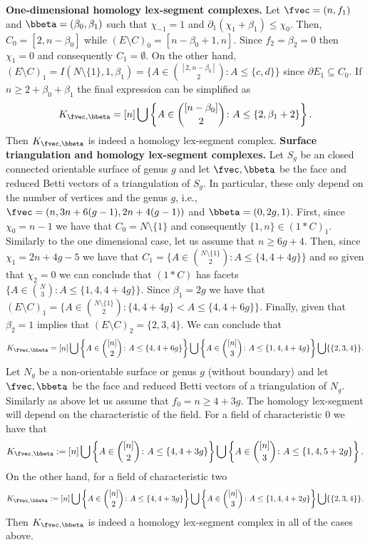%
\noindent
{\bf One-dimensional homology lex-segment complexes.}
Let $\fvec=(n,f_1)$ and $\bbeta=(\beta_0,\beta_1)$ such that $\chi_{-1} = 1$ and $\partial_1(\chi_1+\beta_1)\leq \chi_0$.
Then, $C_0=[2,n-\beta_0]$ while $(E\setminus C)_0=[n-\beta_0+1,n]$.
Since $f_2=\beta_2=0$ then $\chi_1=0$ and consequently $C_1=\emptyset$. 
On the other hand, $(E\setminus C)_1 = I(N\setminus \{1\},1,\beta_1) = \{A \in \binom{[2,n-\beta_0]}{2} \colon A \leq \{c,d\}\}$ since $\partial E_1 \subseteq C_0$.
If $n \geq 2 + \beta_0 + \beta_1$ the final expression can be simplified as
\begin{equation}
  \label{eq:hseggraph}
  K_{\fvec,\bbeta} =  [n] \bigcup \left \{ A \in \binom{[n-\beta_0]}{2} \colon A \leq \{2,\beta_1+2\} \right \}.
\end{equation}
Then $K_{\fvec,\bbeta}$ is indeed a homology lex-segment complex.
%
\noindent
{\bf Surface triangulation and homology lex-segment complexes.}
Let $S_g$ be an closed connected orientable surface of genus $g$ and let $\fvec,\bbeta$ be the face and reduced Betti vectors of a triangulation of $S_g$. 
In particular, these only depend on the number of vertices and the genus $g$, i.e., $\fvec=(n,3n+6(g-1),2n+4(g-1))$ and $\bbeta=(0,2g,1)$.
First, since $\chi_0=n-1$ we have that $C_0=N\setminus \{1\}$ and consequently $\{1,n\}\in (1*C)_1$.
Similarly to the 
one dimensional case,
let us assume that $n\geq 6g+4$.
Then, since $\chi_1 = 2n+4g-5$ we have that $C_1 = \{A \in \binom{N\setminus \{1\}}{2} \colon A \leq \{4,4+4g\}\}$ and so given that $\chi_2=0$ we can conclude that $(1*C)$ has facets $\{A \in \binom{N}{3} \colon A \leq \{1,4,4+4g\}\}$.
%
Since $\beta_1=2g$ we have that $(E\setminus C)_1=\{A \in \binom{N\setminus \{1\}}{2}\colon \{4,4+4g\} < A \leq \{4,4+6g\}\}$. Finally, given that $\beta_2=1$ implies that $(E\setminus C)_2=\{2,3,4\}$. We can conclude that
\begin{equation}
\label{eq:hsegsrf}
K_{\fvec,\bbeta} = [n] \bigcup \left \{A \in \binom{[n]}{2}\colon A \leq \{4,4+6g\} \right \} \bigcup \left \{ A \in \binom{[n]}{3} \colon A \leq \{1,4,4+4g\} \right \} \bigcup \{\{2,3,4\}\}.
\end{equation}
%
Let $N_g$ be a non-orientable surface or genus $g$ (without boundary) and let $\fvec,\bbeta$ be the face and reduced Betti vectors of a triangulation of $N_g$.
Similarly as above let us assume that $f_0=n\geq 4+3g$.
The homology lex-segment will depend on the characteristic of the field. For a field of characteristic $0$ we have that
$$K_{\fvec,\bbeta}:= [n] \bigcup \left \{A \in \binom{[n]}{2}\colon A \leq \{4,4+3g\} \right \} \bigcup \left \{ A \in \binom{[n]}{3} \colon A \leq \{1,4,5+2g\} \right \}.$$
On the other hand, for a field of characteristic two
$$K_{\fvec,\bbeta}:= [n] \bigcup \left \{A\in \binom{[n]}{2}\colon A \leq \{4,4+3g\} \right \} \bigcup \left \{ A \in \binom{[n]}{3} \colon A \leq \{1,4,4+2g\} \right \} \bigcup \{\{2,3,4\}\}.$$
Then $K_{\fvec,\bbeta}$ is indeed a homology lex-segment complex in all of the cases above.
%
%
%
%
